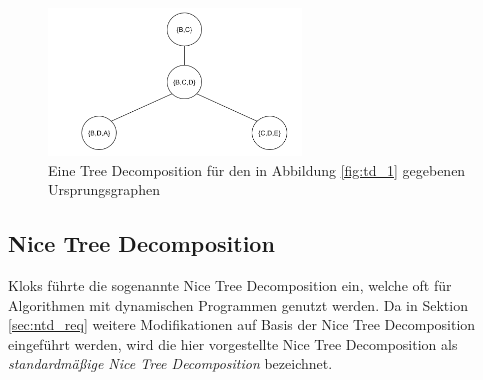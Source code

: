 \begin{figure}
\centering
\includegraphics[width=0.6\textwidth]{./imgs/TD_2.png}
\caption{Eine Tree Decomposition für den in Abbildung \ref{fig:td_1} gegebenen Ursprungsgraphen}
\label{fig:td_2}
\end{figure}

\subsection{Nice Tree Decomposition}
\label{sec:ntd_ntd}
Kloks \cite{kloks1994} führte die sogenannte Nice Tree Decomposition ein, welche oft für Algorithmen mit dynamischen Programmen genutzt werden. Da in Sektion \ref{sec:ntd_req} weitere Modifikationen auf Basis der Nice Tree Decomposition eingeführt werden, wird die hier vorgestellte Nice Tree Decomposition als \textit{standardmäßige Nice Tree Decomposition} bezeichnet.


